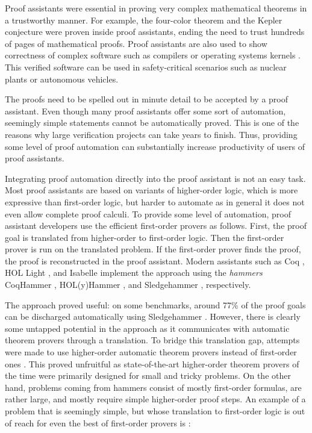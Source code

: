 Proof assistants were essential in proving very complex mathematical theorems in a
trustworthy manner. For example, the four-color theorem \cite{gg-2008-four-color}
and the Kepler conjecture \cite{th-2015-kepler} were proven inside proof assistants,
ending the need to trust hundreds of pages of mathematical proofs. Proof
assistants are also used to show correctness of complex software such as
compilers \cite{xl-09-compcert} or operating systems kernels \cite{gk-09-sel4}.
This verified software can be used in safety-critical scenarios such as nuclear
plants or autonomous vehicles.

The proofs need to be spelled out in minute detail to be accepted by a proof assistant.
Even though many proof assistants offer some sort of automation, seemingly simple
statements cannot be automatically proved. This is one of the reasons why large
verification projects can take years to finish. Thus, providing some level of proof automation
can substantially increase productivity of users of proof assistants.

Integrating proof automation directly into the proof assistant is not an easy task.
Most proof assistants are based on variants of higher-order logic, which is more
expressive than first-order logic, but harder to automate as in general it does not even allow complete
proof calculi. To provide some level of automation, proof assistant developers
use the efficient first-order provers as follows. First, the proof goal is
translated from higher-order to first-order logic. Then the first-order prover
is run on the translated problem. If the first-order prover finds the proof, the
proof is reconstructed in the proof assistant. Modern assistants such as Coq \cite{bc-04-coq}, HOL Light \cite{jh-09-hol-light},
and Isabelle \cite{lc-88-isabelle} implement the approach using the \emph{hammers} CoqHammer
\cite{ck-18-coqhammer}, HOL(y)Hammer \cite{ku-15-holyhammer}, and Sledgehammer
\cite{bn-10-sh}, respectively. 

The approach proved useful: on some benchmarks, around 77\% of the proof goals can be
discharged automatically using Sledgehammer \cite{bgkku-16-larning-fact-selector}. However, there is
clearly some untapped potential in the approach as it communicates with
automatic theorem provers through a translation. To bridge this translation gap,
attempts were made to use higher-order automatic theorem provers instead of
first-order ones \cite{ns-13-leo2sh}. This proved unfruitful as state-of-the-art
higher-order theorem provers of the time were primarily designed for small and
tricky problems. On the other hand, problems coming from hammers consist of
mostly first-order formulas, are rather large, and mostly require simple
higher-order proof steps. An example of a problem that is seemingly simple, but whose translation to first-order logic
is out of reach for even the best of first-order provers is \cite{bbbntvw-2x-mechanical-mathematicians}:

